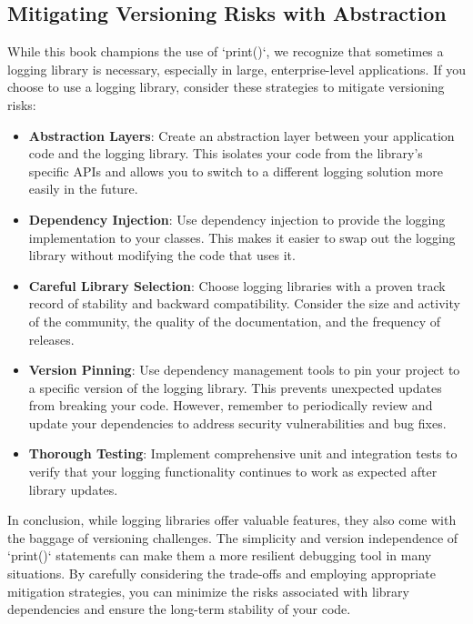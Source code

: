 \documentclass{article}
\begin{document}
{{{{\subsection*{Mitigating Versioning Risks with Abstraction}

While this book champions the use of `print()`, we recognize that sometimes a logging library is necessary, especially in large, enterprise-level applications. If you choose to use a logging library, consider these strategies to mitigate versioning risks:

\begin{itemize}
    \item \textbf{Abstraction Layers}: Create an abstraction layer between your application code and the logging library. This isolates your code from the library's specific APIs and allows you to switch to a different logging solution more easily in the future.

    \item \textbf{Dependency Injection}: Use dependency injection to provide the logging implementation to your classes. This makes it easier to swap out the logging library without modifying the code that uses it.

    \item \textbf{Careful Library Selection}: Choose logging libraries with a proven track record of stability and backward compatibility. Consider the size and activity of the community, the quality of the documentation, and the frequency of releases.

    \item \textbf{Version Pinning}: Use dependency management tools to pin your project to a specific version of the logging library. This prevents unexpected updates from breaking your code. However, remember to periodically review and update your dependencies to address security vulnerabilities and bug fixes.

    \item \textbf{Thorough Testing}: Implement comprehensive unit and integration tests to verify that your logging functionality continues to work as expected after library updates.
\end{itemize}

In conclusion, while logging libraries offer valuable features, they also come with the baggage of versioning challenges. The simplicity and version independence of `print()` statements can make them a more resilient debugging tool in many situations. By carefully considering the trade-offs and employing appropriate mitigation strategies, you can minimize the risks associated with library dependencies and ensure the long-term stability of your code.

}}}}
\end{document}
